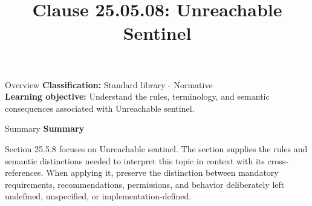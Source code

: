 \documentclass[10pt,letterpaper]{article}
\title{Clause 25.05.08: Unreachable Sentinel}
\author{}
\date{}
\begin{document}
\maketitle
\begin{CornellOverviewBox}{Overview}
\textbf{Classification:} Standard library - Normative\\[2pt]
\textbf{Learning objective:} Understand the rules, terminology, and semantic consequences associated with Unreachable sentinel.
\end{CornellOverviewBox}\begin{CornellSummaryBox}{Summary}
{\sffamily\bfseries\color{Accent} Summary}\par\vspace{3pt}Section 25.5.8 focuses on Unreachable sentinel. The section supplies the rules and semantic distinctions needed to interpret this topic in context with its cross-references. When applying it, preserve the distinction between mandatory requirements, recommendations, permissions, and behavior deliberately left undefined, unspecified, or implementation-defined.
\end{CornellSummaryBox}
\end{document}
